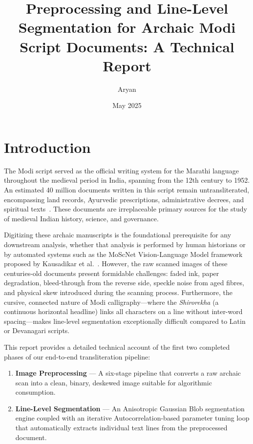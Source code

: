 \documentclass[12pt, a4paper]{article}
\title{\textbf{Preprocessing and Line-Level Segmentation for Archaic Modi Script Documents: A Technical Report}}
\author{Aryan}
\date{May 2025}
\begin{document}
\maketitle

\section{Introduction}

The Modi script served as the official writing system for the Marathi language throughout the medieval period in India, spanning from the 12th century to 1952. An estimated 40 million documents written in this script remain untransliterated, encompassing land records, Ayurvedic prescriptions, administrative decrees, and spiritual texts~\cite{kausadikar2025}. These documents are irreplaceable primary sources for the study of medieval Indian history, science, and governance.

Digitizing these archaic manuscripts is the foundational prerequisite for any downstream analysis, whether that analysis is performed by human historians or by automated systems such as the MoScNet Vision-Language Model framework proposed by Kausadikar et al.~\cite{kausadikar2025}. However, the raw scanned images of these centuries-old documents present formidable challenges: faded ink, paper degradation, bleed-through from the reverse side, speckle noise from aged fibres, and physical skew introduced during the scanning process. Furthermore, the cursive, connected nature of Modi calligraphy---where the \textit{Shirorekha} (a continuous horizontal headline) links all characters on a line without inter-word spacing---makes line-level segmentation exceptionally difficult compared to Latin or Devanagari scripts.

This report provides a detailed technical account of the first two completed phases of our end-to-end transliteration pipeline:

\begin{enumerate}[label=\textbf{Phase \arabic*:}, leftmargin=2.5cm]
    \item \textbf{Image Preprocessing} --- A six-stage pipeline that converts a raw archaic scan into a clean, binary, deskewed image suitable for algorithmic consumption.
    \item \textbf{Line-Level Segmentation} --- An Anisotropic Gaussian Blob segmentation engine coupled with an iterative Autocorrelation-based parameter tuning loop that automatically extracts individual text lines from the preprocessed document.
\end{enumerate}
\end{document}
